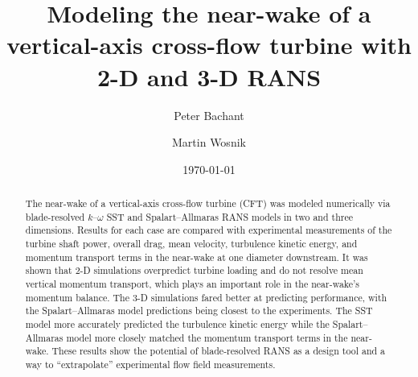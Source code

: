 \documentclass[aip,graphicx]{revtex4-1}
\begin{document}

\title{Modeling the near-wake of a vertical-axis cross-flow turbine with 2-D and
    3-D RANS}



\author{Peter Bachant}

\author{Martin Wosnik}


\date{\today}

\begin{abstract}
    The near-wake of a vertical-axis cross-flow turbine (CFT) was modeled
    numerically via blade-resolved $k$--$\omega$ SST and Spalart--Allmaras RANS
    models in two and three dimensions. Results for each case are compared with
    experimental measurements of the turbine shaft power, overall drag, mean
    velocity, turbulence kinetic energy, and momentum transport terms in the
    near-wake at one diameter downstream. It was shown that 2-D simulations
    overpredict turbine loading and do not resolve mean vertical momentum
    transport, which plays an important role in the near-wake's momentum
    balance. The 3-D simulations fared better at predicting performance, with
    the Spalart--Allmaras model predictions being closest to the experiments.
    The SST model more accurately predicted the turbulence kinetic energy while
    the Spalart--Allmaras model more closely matched the momentum transport
    terms in the near-wake. These results show the potential of blade-resolved
    RANS as a design tool and a way to ``extrapolate'' experimental flow field
    measurements.
\end{abstract}
\end{document}
